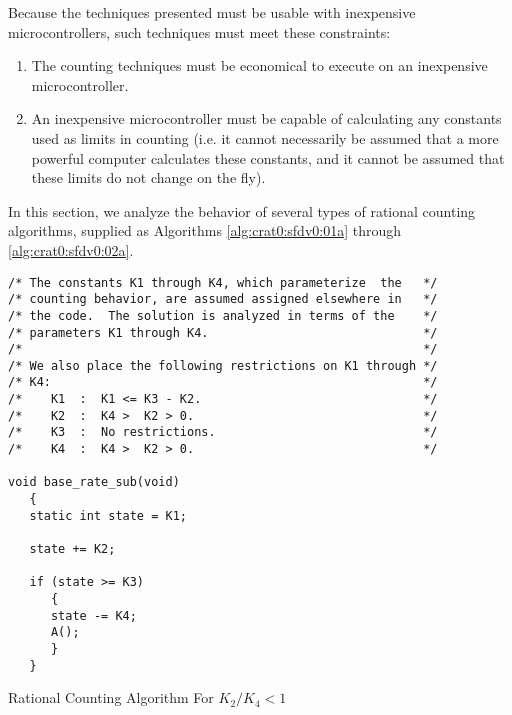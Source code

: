 Because the techniques presented must be usable with inexpensive 
microcontrollers, such techniques must meet these constraints:

\begin{enumerate}
\item \label{enum:01:crat0:sfdv0:econex}
      The counting techniques must be economical to execute on
      an inexpensive microcontroller.
\item \label{enum:01:crat0:sfdv0:econcccalc}
      An inexpensive microcontroller must be capable of calculating any
      constants used as limits in counting (i.e. it cannot necessarily
      be assumed that a more powerful computer calculates these constants,
      and it cannot be assumed that these limits do not change on the fly).
\end{enumerate}

In this section, we analyze the behavior of several types of
rational counting algorithms, supplied as Algorithms
\ref{alg:crat0:sfdv0:01a}
through
\ref{alg:crat0:sfdv0:02a}.

\begin{algorithm}
\begin{verbatim}
/* The constants K1 through K4, which parameterize  the   */
/* counting behavior, are assumed assigned elsewhere in   */
/* the code.  The solution is analyzed in terms of the    */
/* parameters K1 through K4.                              */
/*                                                        */
/* We also place the following restrictions on K1 through */
/* K4:                                                    */
/*    K1  :  K1 <= K3 - K2.                               */
/*    K2  :  K4 >  K2 > 0.                                */
/*    K3  :  No restrictions.                             */
/*    K4  :  K4 >  K2 > 0.                                */

void base_rate_sub(void)
   {
   static int state = K1;

   state += K2;

   if (state >= K3)
      {
      state -= K4;
      A();
      }
   }
\end{verbatim}
\caption{Rational Counting Algorithm For $K_2/K_4 < 1$}
\label{alg:crat0:sfdv0:01a}
\end{algorithm}

